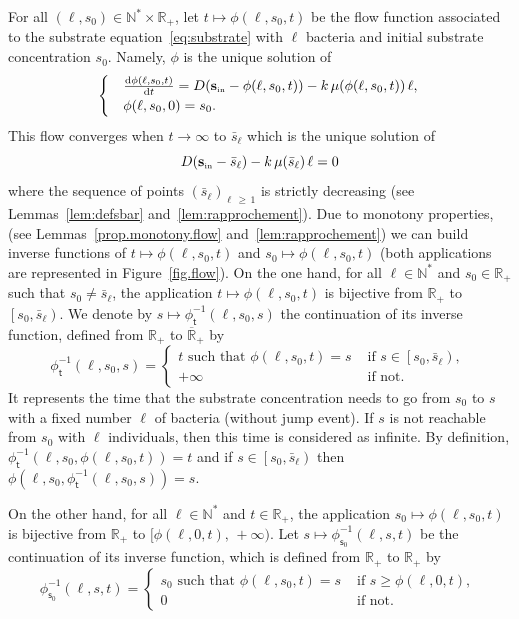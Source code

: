 \documentclass[10pt]{amsart}
\theoremstyle{definition}\newtheorem{defi}[theo]{Definition}\newtheorem{rema}[theo]{Remark}\newtheorem{exam}[theo]{Example}\newtheorem{exem}[theo]{Example}\newtheorem{nota}[theo]{Notation}
\newcommand{\RR}{\mathbb{R}}
\newcommand{\NN}{\mathbb{N}}
\newcommand{\Sin}{{\mathbf s}_{\textrm{\tiny\rm in}}}
\newcommand{\dif}{\mathrm{d}}
\newcommand{\ensco}[2]{\left[#1,#2\right)}
\newcommand{\phit}{\phi_\textsf{t}^{-1}}
\newcommand{\phis}{\phi_{\textsf{s}_0}^{-1}}
\newcommand{\1}{\mathbf{1}}
\begin{document}
For all $(\ell,s_0)\in \NN^*\times \RR_+$, let $t\mapsto \phi(\ell,s_0,t)$ be the flow function associated to the substrate equation~\eqref{eq:substrate} with $\ell$ bacteria and initial substrate concentration $s_0$. Namely, $\phi$ is the unique solution of
\begin{align}\label{eq:flow}
\begin{cases}
&\frac{\dif \phi(\ell,s_0,t)}{\dif t} = D(\Sin-\phi(\ell,s_0,t))-k\,\mu(\phi(\ell,s_0,t))\,\ell,\\
& \phi(\ell,s_0,0)= s_0.
\end{cases}\,
\end{align}
This flow converges when $t\to\infty$ to $\bar s_\ell$ which is the unique solution of
\begin{equation}\label{eq:defsbar}
D(\Sin-\bar s_\ell)-k\,\mu(\bar s_\ell)\,\ell = 0
\end{equation}
where the sequence of points $(\bar s_\ell)_{\ell\,\geq\,1}$ is strictly decreasing (see Lemmas~\ref{lem:defsbar} and~\ref{lem:rapprochement}). Due to monotony properties, (see Lemmas~\ref{prop.monotony.flow} and~\ref{lem:rapprochement}) we can build inverse functions of $t \mapsto \phi(\ell, s_0, t)$ and $s_0 \mapsto \phi(\ell, s_0, t)$ (both applications are represented in Figure~\ref{fig.flow}). On the one hand, for all $\ell\in \NN^*$ and $s_0\in\RR_+$ such that $s_0\neq \bar s_\ell$, the application $t\mapsto \phi(\ell,s_0,t)$ is bijective from $\RR_+$ to $\ensco{s_0}{\bar s_\ell}$. We denote by $s \mapsto \phit(\ell,s_0,s)$ the continuation of its inverse function, defined from $\RR_+$ to $\overline{\RR}_+$ by
\[
\phit(\ell,s_0,s) =
\begin{cases}
t \text{ such that } \phi(\ell,s_0,t)=s & \text{ if } s \in \ensco{s_0}{\bar s_\ell},\\
+ \infty & \text{ if not}.
\end{cases}\,
\]
It represents the time that the substrate concentration needs to go from $s_0$ to $s$ with a fixed number $\ell$ of bacteria (without jump event). If $s$ is not reachable from $s_0$ with $\ell$ individuals, then this time is considered as infinite. By definition, $\phit(\ell,s_0,\phi(\ell,s_0,t))=t$ and if $s \in \ensco{s_0}{\bar s_\ell}$ then $\phi(\ell,s_0,\phit(\ell,s_0,s))=s$.



On the other hand, for all $\ell \in \NN^*$ and $t\in\RR_+$, the application $s_0 \mapsto \phi(\ell,s_0,t)$ is bijective from $\RR_+$ to $[\phi(\ell,0,t),\,+\infty)$. Let $s\mapsto \phis(\ell,s, t)$ be the continuation of its inverse function, which is defined from $\RR_+$ to $\RR_+$ by
\[
\phis(\ell,s,t) =
\begin{cases}
s_0 \text{ such that } \phi(\ell,s_0,t)=s & \text{ if } s \geq \phi(\ell,0,t), \\
0 & \text{ if not}.
\end{cases}\,
\]
\end{document}
